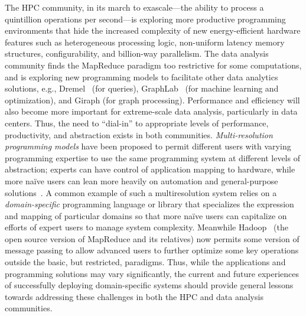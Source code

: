 \documentclass{article}
\begin{document}
The HPC community, in its march to exascale---the ability to process a quintillion operations per second---is exploring more productive programming environments that hide the increased complexity of new energy-efficient hardware features such as heterogeneous processing logic, non-uniform latency memory structures, configurability, and billion-way parallelism.
The data analysis community finds the MapReduce paradigm too restrictive for some computations, and is exploring new programming models to facilitate other data analytics solutions, e.g., Dremel~\cite{Dremel} (for queries), GraphLab~\cite{GraphLab} (for machine learning and optimization), and Giraph (for graph processing).
Performance and efficiency will also become more important for extreme-scale data analysis, particularly in data centers. 
Thus, the need to ``dial-in'' to appropriate levels of performance, productivity, and abstraction
exists in both communities.
\emph{Multi-resolution programming models} have been proposed to permit different users with varying programming expertise to use the same programming system at different levels of abstraction; experts can have control of application mapping to hardware, while more na\"{i}ve users can lean more heavily on automation and general-purpose solutions~\cite{DOE-exaprog}.  A common example of such a multiresolution system relies on a \emph{domain-specific} programming language or library that specializes the expression and mapping of particular domains so that more na\"{i}ve users can capitalize on efforts of expert users to manage system complexity.  
Meanwhile Hadoop~\cite{YARN} (the open source version of MapReduce and its relatives) now permits some version of message passing to allow advanced users to further optimize some key operations outside the basic, but restricted, paradigms.  
Thus, while the applications and programming solutions may vary significantly, the current and future experiences of successfully deploying domain-specific systems should provide general lessons towards addressing these challenges in both the HPC and data analysis communities.  
\end{document}
